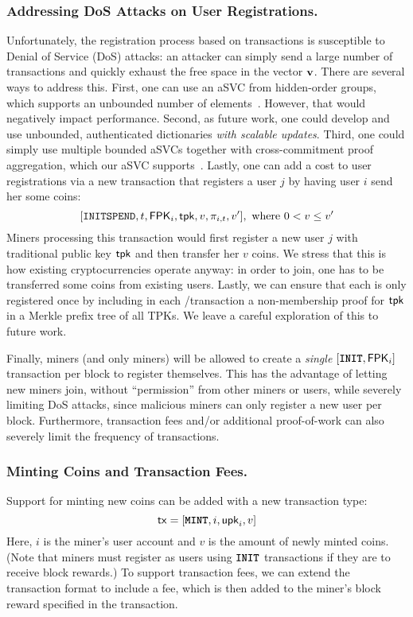 \subsubsection{Addressing DoS Attacks on User Registrations.}
\label{s:stateless-cryptocurrency:dos-registration}

Unfortunately, the registration process based on \inittxn transactions is susceptible to Denial of Service (DoS) attacks:
an attacker can simply send a large number of \inittxn transactions and quickly exhaust the free space in the vector $\bm{\mathrm{v}}$.
There are several ways to address this.
First, one can use an aSVC from hidden-order groups, which supports an unbounded number of elements~\cite{CFG+20}.
However, that would negatively impact performance.
Second, as future work, one could develop and use unbounded, authenticated dictionaries \textit{with scalable updates}.
Third, one could simply use multiple bounded aSVCs together with cross-commitment proof aggregation, which our aSVC supports~\cite{GRWZ20}.
Lastly, one can add a cost to user registrations via a new \initspendtxn transaction that registers a user $j$ by having user $i$ send her some coins:
$$[\texttt{INITSPEND}, t, \mathbf{\mathsf{FPK}}_i, \mathsf{tpk},v,\pi_{i,t}, v'],\ \text{where}\ 0 < v \le v'$$
Miners processing this transaction would first register a new user $j$ with traditional public key $\mathsf{tpk}$ and then transfer her $v$ coins.
We stress that this is how existing cryptocurrencies operate anyway: in order to join, one has to be transferred some coins from existing users.
Lastly, we can ensure that each \tpk is only registered once by including in each \inittxn/\initspendtxn transaction a non-membership proof for $\mathsf{tpk}$ in a Merkle prefix tree of all TPKs.
We leave a careful exploration of this to future work.

Finally, miners (and only miners) will be allowed to create a \textit{single} $[\texttt{\textbf{INIT}}, \mathbf{\mathsf{FPK}}_i]$ transaction per block to register themselves.
This has the advantage of letting new miners join, without ``permission'' from other miners or users, while severely limiting DoS attacks, since malicious miners can only register a new user per block.
Furthermore, transaction fees and/or additional proof-of-work can also severely limit the frequency of \initspendtxn transactions.

\subsubsection{Minting Coins and Transaction Fees.}
Support for minting new coins can be added with a new \minttxn transaction type:
$$\mathsf{tx} = [\texttt{\textbf{MINT}}, i, \mathsf{upk}_i, v]$$
Here, $i$ is the miner's user account and $v$ is the amount of newly minted coins.
(Note that miners must register as users using $\texttt{\textbf{INIT}}$ transactions if they are to receive block rewards.)
To support transaction fees, we can extend the \spendtxn transaction format to include a fee, which is then added to the miner's block reward specified in the \minttxn transaction.

